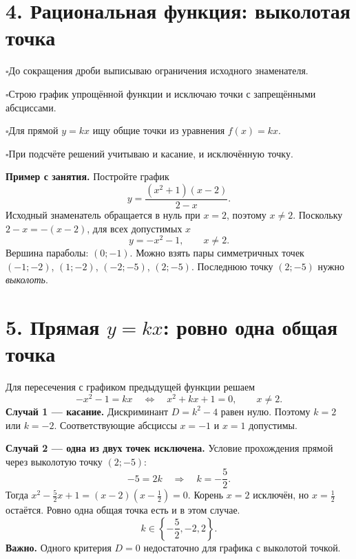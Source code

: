 \documentclass[a4paper,11pt]{article}
\newcommand{\secname}[1]{\section*{\textcolor{darkaccent}{#1}}}
\newcommand{\checkline}[1]{\par\noindent\textcolor{accent}{\(\square\)}\hspace{0.5em}#1\par}
\begin{document}
\clearpage
\secname{4. Рациональная функция: выколотая точка}
\checkline{До сокращения дроби выписываю ограничения исходного знаменателя.}
\checkline{Строю график упрощённой функции и исключаю точки с запрещёнными абсциссами.}
\checkline{Для прямой \(y=kx\) ищу общие точки из уравнения \(f(x)=kx\).}
\checkline{При подсчёте решений учитываю и касание, и исключённую точку.}

\textbf{Пример с занятия.} Постройте график
\[
y=\frac{(x^2+1)(x-2)}{2-x}.
\]
Исходный знаменатель обращается в нуль при \(x=2\), поэтому \(x\ne2\). Поскольку \(2-x=-(x-2)\), для всех допустимых \(x\)
\[
y=-x^2-1,\qquad x\ne2.
\]
Вершина параболы: \((0;-1)\). Можно взять пары симметричных точек \((-1;-2)\), \((1;-2)\), \((-2;-5)\), \((2;-5)\). Последнюю точку \((2;-5)\) нужно \emph{выколоть}.
\begin{center}
\end{center}

\clearpage
\secname{5. Прямая \texorpdfstring{$y=kx$}{y=kx}: ровно одна общая точка}
Для пересечения с графиком предыдущей функции решаем
\[
-x^2-1=kx\quad\Longleftrightarrow\quad x^2+kx+1=0,\qquad x\ne2.
\]
\textbf{Случай 1 --- касание.} Дискриминант \(D=k^2-4\) равен нулю. Поэтому \(k=2\) или \(k=-2\). Соответствующие абсциссы \(x=-1\) и \(x=1\) допустимы.

\textbf{Случай 2 --- одна из двух точек исключена.} Условие прохождения прямой через выколотую точку \((2;-5)\):
\[
-5=2k\quad\Longrightarrow\quad k=-\frac52.
\]
Тогда \(x^2-\frac52x+1=(x-2)(x-\frac12)=0\). Корень \(x=2\) исключён, но \(x=\frac12\) остаётся. Ровно одна общая точка есть и в этом случае.
\[
\boxed{k\in\left\{-\frac52,-2,2\right\}.}
\]
\textcolor{burgundy}{\textbf{Важно.}} Одного критерия \(D=0\) недостаточно для графика с выколотой точкой.
\end{document}
